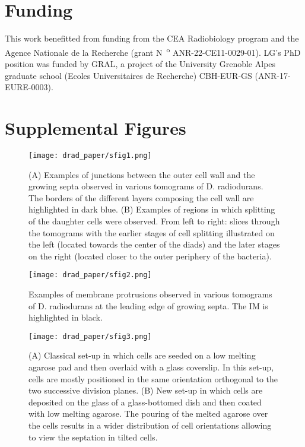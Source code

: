 \section{Funding}
This work benefitted from funding from the CEA Radiobiology program and the Agence Nationale de la Recherche (grant N~\textsuperscript{o} ANR-22-CE11-0029-01).
LG's PhD position was funded by GRAL, a project of the University Grenoble Alpes graduate school (Ecoles Universitaires de Recherche) CBH-EUR-GS (ANR-17-EURE-0003).

\newpage

\section{Supplemental Figures}

\begin{figure}[ht]
    \centering
    \texttt{[image: drad\_paper/sfig1.png]}
    \caption[Cell wall junction examples]{(A) Examples of junctions between the outer cell wall and the growing septa observed in various tomograms of D. radiodurans. The borders of the different layers composing the cell wall are highlighted in dark blue. (B) Examples of regions in which splitting of the daughter cells were observed. From left to right: slices through the tomograms with the earlier stages of cell splitting illustrated on the left (located towards the center of the diads) and the later stages on the right (located closer to the outer periphery of the bacteria).}
    \label{drad_sfig1}
\end{figure}

\begin{figure}[ht]
    \centering
    \texttt{[image: drad\_paper/sfig2.png]}
    \caption[Membrane protrusion examples]{Examples of membrane protrusions observed in various tomograms of D. radiodurans at the leading edge of growing septa. The IM is highlighted in black.}
    \label{drad_sfig2}
\end{figure}

\begin{figure}[ht]
    \centering
    \texttt{[image: drad\_paper/sfig3.png]}
    \caption[Microscopy set-ups for timelapse 3D confocal video-microscopy]{(A) Classical set-up in which cells are seeded on a low melting agarose pad and then overlaid with a glass coverslip. In this set-up, cells are mostly positioned in the same orientation orthogonal to the two successive division planes. (B) New set-up in which cells are deposited on the glass of a glass-bottomed dish and then coated with low melting agarose. The pouring of the melted agarose over the cells results in a wider distribution of cell orientations allowing to view the septation in tilted cells.}
    \label{drad_sfig3}
\end{figure}

